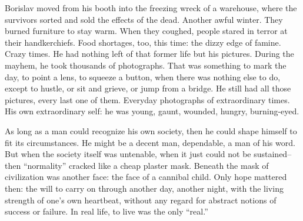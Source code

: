 \documentclass[20 pt,twoside,extrafontsizes,final]{memoir}
\begin{document}
Borislav moved from his booth into the freezing wreck of a warehouse, where the survivors sorted and sold the effects of the dead. Another awful winter. They burned furniture to stay warm. When they coughed, people stared in terror at their handkerchiefs. Food shortages, too, this time: the dizzy edge of famine. Crazy times. He had nothing left of that former life but his pictures. During the mayhem, he took thousands of photographs. That was something to mark the day, to point a lens, to squeeze a button, when there was nothing else to do, except to hustle, or sit and grieve, or jump from a bridge. He still had all those pictures, every last one of them. Everyday photographs of extraordinary times. His own extraordinary self: he was young, gaunt, wounded, hungry, burning-eyed.

As long as a man could recognize his own society, then he could shape himself to fit its circumstances. He might be a decent man, dependable, a man of his word. But when the society itself was untenable, when it just could not be sustained--then ``normality'' cracked like a cheap plaster mask. Beneath the mask of civilization was another face: the face of a cannibal child. Only hope mattered then: the will to carry on through another day, another night, with the living strength of one's own heartbeat, without any regard for abstract notions of success or failure. In real life, to live was the only ``real.''
\end{document}
